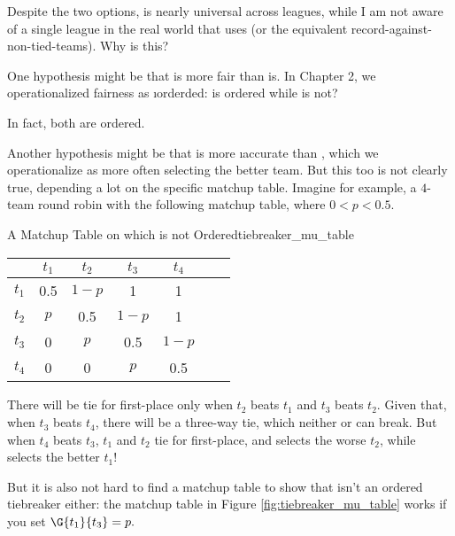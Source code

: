 {    Despite the two options,  is nearly universal across leagues, while I am not aware of a single league in the real world that uses  (or the equivalent record-against-non-tied-teams). Why is this?

    One hypothesis might be that  is more fair than  is. In Chapter 2, we operationalized fairness as \i{orderded}: is  ordered while  is not? %

    In fact, both are ordered.


    Another hypothesis might be that  is more \i{accurate} than , which we operationalize as  more often selecting the better team. But this too is not clearly true, depending a lot on the specific matchup table. Imagine for example, a $4$-team round robin with the following matchup table, where $0 < p < 0.5.$

    \begin{figg}{A Matchup Table on which  is not Ordered}{tiebreaker_mu_table}
        \begin{center}
            \begin{tabular}{c | c c c c c c}
            & $t_1$ & $t_2$ & $t_3$ & $t_4$\\ 
            \hline
            $t_1$ & 0.5 & $1- p$ & 1 & 1 \\
            $t_2$ & $p$ & 0.5 & $1- p$ & 1 \\
            $t_3$ & 0 & $p$ & 0.5 & $1- p$ \\
            $t_4$ & 0 & 0 & $p$ & 0.5 \\
            \end{tabular}
        \end{center}
    \end{figg}

    There will be tie for first-place only when $t_2$ beats $t_1$ and $t_3$ beats $t_2.$ Given that, when $t_3$ beats $t_4$, there will be a three-way tie, which neither  or  can break. But when $t_4$ beats $t_3$, $t_1$ and $t_2$ tie for first-place, and  selects the worse $t_2$, while  selects the better $t_1$!

    But it is also not hard to find a matchup table to show that  isn't an ordered tiebreaker either: the matchup table in Figure \ref{fig:tiebreaker_mu_table} works if you set $\G{t_1}{t_3} = p.$

}

